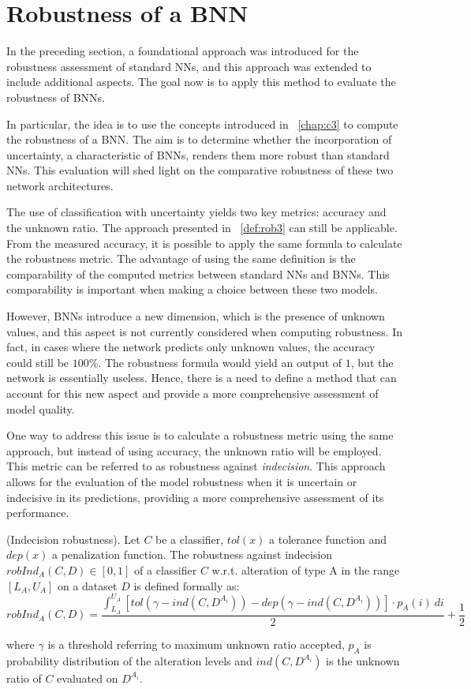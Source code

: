 \section{Robustness of a BNN}

In the preceding section, a foundational approach was introduced for the robustness assessment of standard NNs, and this approach was extended to include additional aspects. The goal now is to apply this method to evaluate the robustness of BNNs.

In particular, the idea is to use the concepts introduced in \Chap~\ref{chap:c3} to compute the robustness of a BNN. The aim is to determine whether the incorporation of uncertainty, a characteristic of BNNs, renders them more robust than standard NNs. This evaluation will shed light on the comparative robustness of these two network architectures.

The use of classification with uncertainty yields two key metrics: accuracy and the unknown ratio. The approach presented in \Def~\ref{def:rob3} can still be applicable. From the measured accuracy, it is possible to apply the same formula to calculate the robustness metric. The advantage of using the same definition is the comparability of the computed metrics between standard NNs and BNNs. This comparability is important when making a choice between these two models.

However, BNNs introduce a new dimension, which is the presence of unknown values, and this aspect is not currently considered when computing robustness. In fact, in cases where the network predicts only unknown values, the accuracy could still be $100\%$. The robustness formula would yield an output of $1$, but the network is essentially useless. Hence, there is a need to define a method that can account for this new aspect and provide a more comprehensive assessment of model quality.

One way to address this issue is to calculate a robustness metric using the same approach, but instead of using accuracy, the unknown ratio will be employed. This metric can be referred to as robustness against \textit{indecision}. This approach allows for the evaluation of the model robustness when it is uncertain or indecisive in its predictions, providing a more comprehensive assessment of its performance.

\begin{definition}\label{def:robind} (Indecision robustness).
	Let $C$ be a classifier, $tol(x)$ a tolerance function and $dep(x)$ a penalization function.
	The robustness against indecision $robInd_A(C,D) \in [0,1]$ of a classifier $C$ w.r.t. alteration of type A in the range $[L_A, U_A]$ on a dataset $D$ is defined formally as:
	\[
		robInd_A(C,D) = \frac{\int_{L_A}^{U_A} [tol(\gamma - ind(C,D^{A_i})) - dep(\gamma - ind(C,D^{A_i}))] \cdot p_A(i)\ di}{2} + \frac{1}{2}
	\]
	
	where $\gamma$ is a threshold referring to maximum unknown ratio accepted, $p_A$ is probability distribution of the alteration levels and $ind(C,D^{A_i})$ is the unknown ratio of $C$ evaluated on $D^{A_i}$.
\end{definition}

